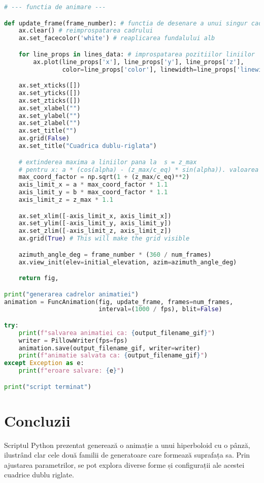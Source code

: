 \documentclass[a4paper,11pt]{article}
\begin{document}
\begin{lstlisting}[language=Python, caption=Script Python pentru animația cuadricei dublu riglate, label=lst:python_code]
# --- functia de animare ---

def update_frame(frame_number): # functia de desenare a unui singur cadru
    ax.clear() # reimprospatarea cadrului
    ax.set_facecolor('white') # reaplicarea fundalului alb

    for line_props in lines_data: # improspatarea pozitiilor liniilor
        ax.plot(line_props['x'], line_props['y'], line_props['z'],
                color=line_props['color'], linewidth=line_props['linewidth'])

    ax.set_xticks([])
    ax.set_yticks([])
    ax.set_zticks([])
    ax.set_xlabel("")
    ax.set_ylabel("")
    ax.set_zlabel("")
    ax.set_title("")
    ax.grid(False)
    ax.set_title("Cuadrica dublu-riglata")

    # extinderea maxima a liniilor pana la  s = z_max
    # pentru x: a * (cos(alpha) - (z_max/c_eq) * sin(alpha)). valoarea maxima este: a * sqrt(1 + (z_max/c_eq)^2)
    max_coord_factor = np.sqrt(1 + (z_max/c_eq)**2)
    axis_limit_x = a * max_coord_factor * 1.1
    axis_limit_y = b * max_coord_factor * 1.1
    axis_limit_z = z_max * 1.1

    ax.set_xlim([-axis_limit_x, axis_limit_x])
    ax.set_ylim([-axis_limit_y, axis_limit_y])
    ax.set_zlim([-axis_limit_z, axis_limit_z])
    ax.grid(True) # This will make the grid visible

    azimuth_angle_deg = frame_number * (360 / num_frames)
    ax.view_init(elev=initial_elevation, azim=azimuth_angle_deg)

    return fig,

print("generarea cadrelor animatiei")
animation = FuncAnimation(fig, update_frame, frames=num_frames,
                          interval=(1000 / fps), blit=False)

try:
    print(f"salvarea animatiei ca: {output_filename_gif}")
    writer = PillowWriter(fps=fps)
    animation.save(output_filename_gif, writer=writer)
    print(f"animatie salvata ca: {output_filename_gif}")
except Exception as e:
    print(f"eroare salvare: {e}")

print("script terminat")
\end{lstlisting}

\section{Concluzii}
Scriptul Python prezentat generează o animație a unui hiperboloid cu o pânză, ilustrând clar cele două familii de generatoare care formează suprafața sa. Prin ajustarea parametrilor, se pot explora diverse forme și configurații ale acestei cuadrice dublu riglate.
\end{document}
